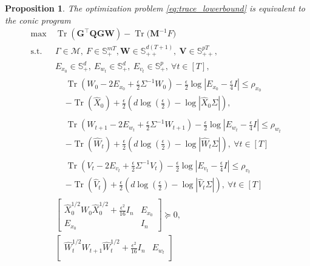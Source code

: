 \documentclass[10pt,a4paper]{amsart}
\newtheorem{proposition}{Proposition}
\DeclareMathOperator{\Tr}{Tr}
\begin{document}
\begin{proposition}
\label{prop:SDP_reformulation}
The optimization problem \eqref{eq:trace_lowerbound} is equivalent to the conic program
\begin{align*}
\max \ 
&\Tr(\mathbf{G^{\top} Q G W}) - 
\Tr\big(\mathbf{M}^{-1} F\big)
\\
\text{s.t.} \
&\Gamma \in \mathcal{M}, \ 
F \in \mathbb{S}_{+}^{mT},\mathbf{W} \in \mathbb{S}_{++}^{d(T+1)}, \ 
\mathbf{V} \in \mathbb{S}_{++}^{pT},
\\[1pt]
& E_{x_0} \in \mathbb{S}_{+}^{d}, \ 
E_{w_t} \in \mathbb{S}_{+}^{d}, \ 
E_{v_t} \in \mathbb{S}_{+}^{p}, \ \forall t \in [T],
\\[2pt]
&\begin{aligned}
&\Tr\!\left(\!W_0\! -\! 2E_{x_0}\!+\!\frac{\epsilon}{2}\Sigma^{-1}W_0\!\right)\! -\! \frac{\epsilon}{2}\log\left|E_{x_0}\! - \frac{\epsilon}{4}I\right| \leq \rho_{x_0}
\\
&- \Tr(\hat{X}_0) + \frac{\epsilon}{2}\left(d\log\left(\frac{\epsilon}{2}\right)-\log|\hat{X}_0\Sigma|\right),
\end{aligned}
\\[2pt]
&\begin{aligned}
&\Tr\left(\!W_{t+1}\!\! -\! 2E_{w_t}\!\!+\!\frac{\epsilon}{2}\Sigma^{-1}W_{t+1}\!\right)\!\! -\! \frac{\epsilon}{2}\!\log\!\left|E_{w_t}\!\! -\! \frac{\epsilon}{4}I\right|\! \!\leq\! \rho_{w_t}
\\
&- \Tr(\hat{W}_t) + \frac{\epsilon}{2}\left(d\log\left(\frac{\epsilon}{2}\right)-\log|\hat{W}_t\Sigma|\right),\ \forall t \in [T]
\end{aligned}
\\[2pt]
&\begin{aligned}
&\Tr\left(V_{t}\! -\! 2E_{v_t}\!+\!\frac{\epsilon}{2}\Sigma^{-1}V_{t}\right)\!-\! \frac{\epsilon}{2}\log\left|E_{v_t}\! -\! \frac{\epsilon}{4}I\right| \leq\rho_{v_t}
\\
&- \Tr(\hat{V}_t) + \frac{\epsilon}{2}\left(d\log\left(\frac{\epsilon}{2}\right)-\log|\hat{V}_t\Sigma|\right),\ \forall t \in [T]
\end{aligned}
\\[2pt]
& 
\begin{bmatrix}
\hat{X}_0^{1/2} W_0 \hat{X}_0^{1/2} +\frac{\epsilon^2}{16}I_n & E_{x_0} \\
E_{x_0} & I_n
\end{bmatrix} \succeq 0, 
\\[1pt]
& 
\begin{bmatrix}
\hat{W}_t^{1/2} W_{t+1} \hat{W}_t^{1/2} +\frac{\epsilon^2}{16}I_n & E_{w_t} \\

\end{bmatrix}
\end{align*}
\end{proposition}
\end{document}
